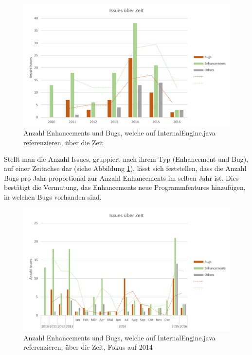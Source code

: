 \documentclass[10pt, a4paper]{article}
\begin{document}
\begin{figure}[!ht]
	\centering
	\includegraphics[width=1\textwidth]{resources/images/issues_over_time_internalengine.png}
	\caption{Anzahl Enhancements und Bugs, welche auf InternalEngine.java referenzieren, über die Zeit}
	\label{fig:issues_over_time_internalengine}
\end{figure}

Stellt man die Anzahl Issues, gruppiert nach ihrem Typ (Enhancement und Bug), auf einer Zeitachse dar (siehe Abbildung \ref{fig:issues_over_time_internalengine}), lässt sich feststellen, dass die Anzahl Bugs pro Jahr proportional zur Anzahl Enhancements im selben Jahr ist. Dies bestätigt die Vermutung, das Enhancements neue Programmfeatures hinzufügen, in welchen Bugs vorhanden sind.

\begin{figure}[!ht]
	\centering
	\includegraphics[width=1\textwidth]{resources/images/issues_over_time_internalengine2.png}
	\caption{Anzahl Enhancements und Bugs, welche auf InternalEngine.java referenzieren, über die Zeit, Fokus auf 2014}
	\label{fig:issues_over_time_internalengine2}
\end{figure}
\end{document}
